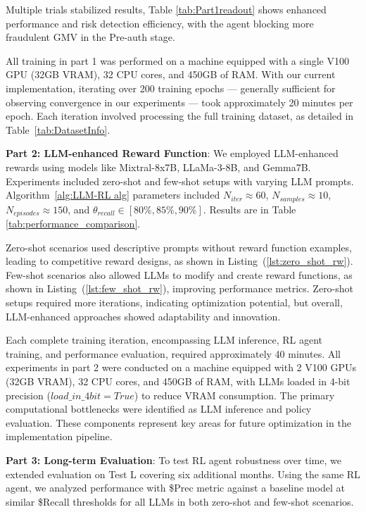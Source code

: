 \documentclass[11pt]{article}
\begin{document}
Multiple trials stabilized results, Table \ref{tab:Part1readout} shows enhanced performance and risk detection efficiency, with the agent blocking more fraudulent GMV in the Pre-auth stage. 

All training in part 1 was performed on a machine equipped with a single V100 GPU (32GB VRAM), 32 CPU cores, and 450GB of RAM. With our current implementation, iterating over 200 training epochs — generally sufficient for observing convergence in our experiments — took approximately 20 minutes per epoch. Each iteration involved processing the full training dataset, as detailed in Table~\ref{tab:DatasetInfo}.

\textbf{Part 2: LLM-enhanced Reward Function}:
We employed LLM-enhanced rewards using models like Mixtral-8x7B, LLaMa-3-8B, and Gemma7B. Experiments included zero-shot and few-shot setups with varying LLM prompts. Algorithm~\ref{alg:LLM-RL alg} parameters included $N_{iter} \approx 60$, $N_{samples} \approx 10$, $N_{episodes}\approx 150$, and $\theta_{recall}\in [80\%,85\%,90\%]$. Results are in Table \ref{tab:performance_comparison}.

Zero-shot scenarios used descriptive prompts without reward function examples, leading to competitive reward designs, as shown in Listing~(\ref{lst:zero_shot_rw}). Few-shot scenarios also allowed LLMs to modify and create reward functions, as shown in Listing~(\ref{lst:few_shot_rw}), improving performance metrics. Zero-shot setups required more iterations, indicating optimization potential, but overall, LLM-enhanced approaches showed adaptability and innovation.

Each complete training iteration, encompassing LLM inference, RL agent training, and performance evaluation, required approximately 40 minutes. All experiments in part 2 were conducted on a machine equipped with 2 V100 GPUs (32GB VRAM), 32 CPU cores, and 450GB of RAM, with LLMs loaded in 4-bit precision ($load\_in\_4bit=True$) to reduce VRAM consumption. The primary computational bottlenecks were identified as LLM inference and policy evaluation. These components represent key areas for future optimization in the implementation pipeline.

\textbf{Part 3: Long-term Evaluation}:
To test RL agent robustness over time, we extended evaluation on Test L covering six additional months. Using the same RL agent, we analyzed performance with \$Prec metric against a baseline model at similar \$Recall thresholds for all LLMs in both zero-shot and few-shot scenarios.
\end{document}
